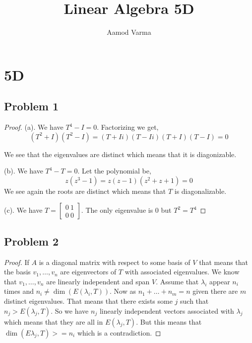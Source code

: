 \documentclass[a4paper]{report}
\title{Linear Algebra 5D}
\author{Aamod Varma}
\begin{document}
\maketitle
\date{}

\section*{5D}
\subsection*{Problem 1}
\begin{proof}
   (a). We have $T^{4} - I = 0$. Factorizing we get, 
   $$ (T^2 + I)(T^2 - I) = (T + Ii)(T -Ii)(T + I)(T - I) = 0 $$ 
   
   We see that the eigenvalues are distinct which means that it is diagonizable.
   
   (b). We have $T^{4} - T = 0$. Let the polynomial be, 
   $$ z(z^{3} - 1) = z(z - 1)(z^2 + z + 1) = 0 $$ 
   We see again the roots are distinct which means that $T$ is diagonalizable.

   (c). We have $T = \begin{bmatrix} 0  \ 1 \\ 0 \ 0 \end{bmatrix}$. The only eigenvalue is $0$ but $T^2 = T^{4}$
\end{proof}
\subsection*{Problem 2}
\begin{proof}
   If $A$ is a diagonal matrix with respect to some basis of $V$ that means that the basis $v_1,\dots,v_n$ are eigenvectors of $T$ with associated eigenvalues. We know that $v_1,\dots,v_n$ are linearly independent and span $V$. Assume that $\lambda_i$ appear $n_i$ times and $n_i \ne \dim(E(\lambda_i, T))$. Now as $n_1+\dots+n_m = n$ given there are  $m$ distinct eigenvalues. That means that there exists some $j$ such that $n_j > E(\lambda_j, T)$. So we have  $n_j$ linearly independent vectors associated with $\lambda_j$ which means that they are all in  $E(\lambda_j, T)$. But this means that  $\dim(E\lambda_j, T) >= n_i$ which is a contradiction.
\end{proof}
\end{document}
